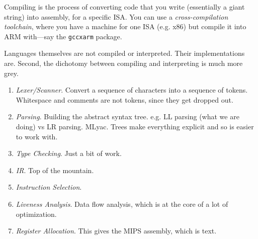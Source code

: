 
Compiling is the process of converting code that you write (essentially a giant string) into assembly, for a specific ISA. You can use a \textit{cross-compilation toolchain}, where you have a machine for one ISA (e.g. x86) but compile it into ARM with---say the \texttt{gccxarm} package. 

Languages themselves are not compiled or interpreted. Their implementations are. Second, the dichotomy between compiling and interpreting is much more grey. 

\begin{enumerate}
  \item \textit{Lexer/Scanner}. Convert a sequence of characters into a sequence of tokens. Whitespace and comments are not tokens, since they get dropped out. 
  \item \textit{Parsing}. Building the abstract syntax tree. e.g. LL parsing (what we are doing) vs LR parsing. MLyac. Trees make everything explicit and so is easier to work with. 
  \item \textit{Type Checking}. Just a bit of work. 
  \item \textit{IR}. Top of the mountain. 
  \item \textit{Instruction Selection}. 
  \item \textit{Liveness Analysis}. Data flow analysis, which is at the core of a lot of optimization. 
  \item \textit{Register Allocation}. This gives the MIPS assembly, which is text. 
\end{enumerate}

